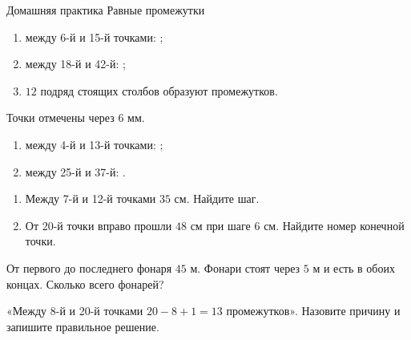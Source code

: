 \worksheettitle
  {Домашняя практика}
  { Равные промежутки}

\studentnameblock

\begin{practicebox}
  \begin{enumerate}[label=\alph*)]
    \item между 6-й и 15-й точками: \answerblank[18mm];
    \item между 18-й и 42-й: \answerblank[18mm];
    \item $12$ подряд стоящих столбов образуют \answerblank[18mm]
      промежутков.
  \end{enumerate}
\end{practicebox}

\begin{practicebox}
  Точки отмечены через $6$ мм.
  \begin{enumerate}[label=\alph*)]
    \item между 4-й и 13-й точками: \answerblank[55mm];
    \item между 25-й и 37-й: \answerblank[55mm].
  \end{enumerate}
\end{practicebox}

\begin{practicebox}
  \begin{enumerate}[label=\alph*)]
    \item Между 7-й и 12-й точками $35$ см. Найдите шаг.
    \item От 20-й точки вправо прошли $48$ см при шаге $6$ см.
      Найдите номер конечной точки.
  \end{enumerate}
\end{practicebox}

\begin{practicebox}
  От первого до последнего фонаря $45$ м. Фонари стоят через $5$ м и есть
  в обоих концах. Сколько всего фонарей? 
\end{practicebox}

\begin{warningbox}
  «Между 8-й и 20-й точками $20-8+1=13$ промежутков».
  Назовите причину и запишите правильное решение. 
\end{warningbox}
